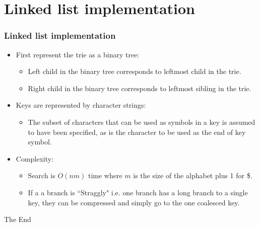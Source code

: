 \documentclass{beamer}
\begin{document}
\section{Linked list implementation}
\begin{frame}
\frametitle{Linked list implementation}
\begin{itemize}
\item First represent the trie as a binary tree:
\begin{itemize}
\item Left child in the binary tree corresponds to leftmost child in the trie.
\item Right child in the binary tree corresponds to leftmost sibling in the trie.
\end{itemize}
\item Keys are represented by character strings:
\begin{itemize}
\item The subset of characters that can be used as symbols in a key is assumed to have been specified, as is the character to be used as the end of key symbol.
\end{itemize}
\item Complexity:
\begin{itemize}
\item Search is $O(nm)$ time where $m$ is the size of the alphabet plus 1 for \$.
\item If a a branch is ``Straggly" i.e. one branch has a long branch to a single key, they can be compressed and simply go to the one coalesced key.
\end{itemize}
\end{itemize}
\end{frame}


\begin{frame} 
\Huge{\centerline{The End}}
\end{frame}
\end{document}
